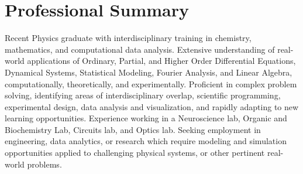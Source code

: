 \documentclass[letterpaper,11pt]{article}
\begin{document}
\section{Professional Summary}
  \vspace{3pt}
  \begin{center}
    Recent Physics graduate with interdisciplinary training in chemistry, mathematics, and computational data analysis. Extensive understanding
    of real-world applications of Ordinary, Partial, and Higher Order Differential Equations, Dynamical Systems, Statistical Modeling, Fourier Analysis, 
    and Linear Algebra, computationally, theoretically, and experimentally. Proficient in complex problem solving, identifying areas of interdisciplinary overlap,
    scientific programming, experimental design, data analysis and visualization, and rapidly adapting
    to new learning opportunities. Experience working in a Neuroscience lab, Organic and Biochemistry Lab, Circuits lab, and Optics lab. 
    Seeking employment in engineering, data analytics, or research which require modeling and simulation opportunities applied to challenging physical systems, or
    other pertinent real-world problems.

% 


\end{center}
\end{document}
